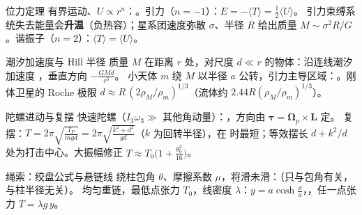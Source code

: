 \begin{结论}{位力定理}
有界运动、$U\propto r^n$：。引力（$n=-1$）：$E=-\langle T\rangle=\frac12\langle U\rangle$。
引力束缚系统失去能量会\textbf{升温}（负热容）；星系团速度弥散 $\sigma$、半径 $R$ 给出质量 $M\sim\sigma^2R/G$。谐振子（$n=2$）：$\langle T\rangle=\langle U\rangle$。
\end{结论}

\begin{结论}{潮汐加速度与 Hill 半径}
质量 $M$ 在距离 $r$ 处，对尺度 $d\ll r$ 的物体：沿连线潮汐加速度 ，垂直方向 $-\frac{GMd}{r^3}$。
小天体 $m$ 绕 $M$ 以半径 $a$ 公转，引力主导区域：。刚体卫星的 Roche 极限 $d\approx R\,(2\rho_M/\rho_m)^{1/3}$（流体约 $2.44R(\rho_M/\rho_m)^{1/3}$）。
\end{结论}

\begin{结论}{陀螺进动与复摆}
快速陀螺（$I_3\omega_3\gg$ 其他角动量）：，方向由 $\boldsymbol\tau=\boldsymbol\Omega_p\times\mathbf L$ 定。
复摆：$T=2\pi\sqrt{\frac{I_P}{mgd}}=2\pi\sqrt{\frac{k^2+d^2}{gd}}$（$k$ 为回转半径），在  时最短；等效摆长 $d+k^2/d$ 处为打击中心。大振幅修正 $T\approx T_0\bigl(1+\frac{\theta_0^2}{16}\bigr)$。
\end{结论}

\begin{结论}{绳索：绞盘公式与悬链线}
绕柱包角 $\theta$、摩擦系数 $\mu$，将滑未滑：（只与包角有关，与柱半径无关）。
均匀重链，最低点张力 $T_0$，线密度 $\lambda$：$y=a\cosh\frac xa$，，任一点张力 $T=\lambda g\,y$。
\end{结论}

